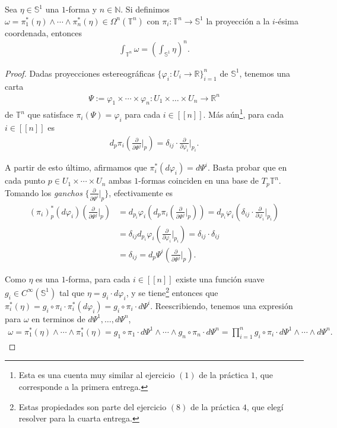 \documentclass[11pt]{article}
\newcommand{\N}{\mathbb{N}}
\newcommand{\R}{\mathbb{R}}
\newcommand{\Ss}{\mathbb{S}}
\newcommand{\T}{\mathbb{T}}
\newcommand{\nat}[1]{[\![#1]\!]}
\newcommand{\paint}[1]{\color{color}{#1}}
\newenvironment{lemma}[2][Lema]{\begin{trivlist}
\item[\hskip \labelsep \paint{{\bfseries #1}}\hskip \labelsep {\bfseries #2.}]}{\end{trivlist}}
\begin{document}
\begin{lemma}{4} Sea $\eta \in \Ss^1$ una $1$-forma y $n \in \N$. Si definimos $\omega = \pi^\ast_1(\eta) \wedge \cdots \wedge \pi^\ast_n(\eta) \in \Omega^n(\T^n)$ con $\pi_i : \T^n \to \Ss^1$ la proyección a la $i$-ésima coordenada, entonces
\begin{align*}
\int_{\T^n}\omega = \left(\int_{\Ss^1} \eta\right)^n.
\end{align*}
\end{lemma}
\begin{proof} Dadas proyecciones estereográficas $\{\varphi_i : U_i \to \R \}_{i=1}^n$ de $\Ss^1$, tenemos una carta
\begin{align*}
\Psi := \varphi_1 \times \cdots \times \varphi_n : U_1 \times \dots \times U_n \to \R^n
\end{align*}
de $\T^n$ que satisface $\pi_i(\Psi) = \varphi_i$ para cada $i \in \nat{n}$. Más aún\footnote{Esta es una cuenta muy similar al ejercicio $(1)$ de la práctica $1$, que corresponde a la primera entrega.}, para cada $i \in \nat{n}$ es
\begin{align*}
d_p\pi_i\left(\frac{\partial}{\partial \Psi^j}\Big|_p\right) = \delta_{ij} \cdot \frac{\partial}{\partial \varphi_i}\Big|_{p_i}.
\end{align*}

A partir de esto último, afirmamos que $\pi_i^*(d\varphi_i) = d\Psi^i$. Basta probar que en cada punto $p \in U_1 \times \cdots \times U_n$ ambas $1$-formas coinciden en una base de $T_p\T^n$. Tomando los \textit{ganchos} $\{\frac{\partial}{\partial \Psi^i}\big|_p\}$, efectivamente es
\begin{align*}
(\pi_i)_p^*(d\varphi_i)\left(\frac{\partial}{\partial \Psi^j}\Big|_p\right) &= d_{p_i}\varphi_i\left(d_p\pi_i\left(\frac{\partial}{\partial \Psi^j}\Big|_p\right) \right) = d_{p_i}\varphi_i\left(\delta_{ij} \cdot \frac{\partial}{\partial \varphi_i}\Big|_{p_i}\right)
\\&= \delta_{ij}d_{p_i}\varphi_i\left(\frac{\partial}{\partial \varphi_i}\Big|_{p_i}\right) = \delta_{ij} \cdot \delta_{ij}\\
&= \delta_{ij} = d_p\Psi^i\left(\frac{\partial}{\partial \Psi^j}\Big|_p\right).
\end{align*}

Como $\eta$ es una $1$-forma, para cada $i \in \nat{n}$ existe una función suave $g_i \in C^\infty(\Ss^1)$ tal que $\eta = g_i \cdot d\varphi_i$, y se tiene\footnote{Estas propiedades son parte del ejercicio $(8)$ de la práctica $4$, que elegí resolver para la cuarta entrega.} entonces que $\pi_i^\ast(\eta) = g_i \circ \pi_i \cdot \pi_i^*(d\varphi_i) = g_i \circ \pi_i \cdot d\Psi^i$. Reescribiendo, tenemos una expresión para $\omega$ en terminos de $d\Psi^1, \dots, d\Psi^n$,
\begin{align*}
\omega = \pi^\ast_1(\eta) \wedge \cdots \wedge \pi^\ast_1(\eta) = g_1 \circ \pi_1 \cdot d\Psi^1 \wedge \cdots \wedge g_n \circ \pi_n \cdot d\Psi^n = \prod_{i = 1}^{n}g_i \circ \pi_i \cdot d\Psi^1 \wedge \cdots \wedge d\Psi^n.
\end{align*}


\end{proof}
\end{document}

